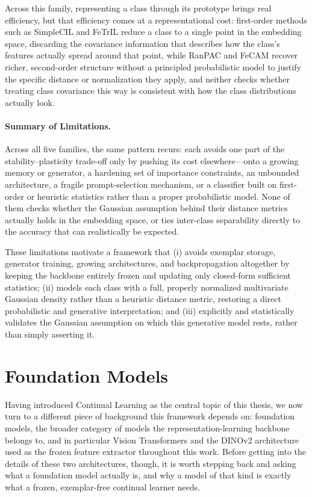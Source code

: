 Across this family, representing a class through its prototype brings real efficiency, but that efficiency comes at a representational cost: first-order methods such as SimpleCIL and FeTrIL reduce a class to a single point in the embedding space, discarding the covariance information that describes how the class's features actually spread around that point, while RanPAC and FeCAM recover richer, second-order structure without a principled probabilistic model to justify the specific distance or normalization they apply, and neither checks whether treating class covariance this way is consistent with how the class distributions actually look.

\paragraph{Summary of Limitations.}
Across all five families, the same pattern recurs: each avoids one part of the stability--plasticity trade-off only by pushing its cost elsewhere---onto a growing memory or generator, a hardening set of importance constraints, an unbounded architecture, a fragile prompt-selection mechanism, or a classifier built on first-order or heuristic statistics rather than a proper probabilistic model. None of them checks whether the Gaussian assumption behind their distance metrics actually holds in the embedding space, or ties inter-class separability directly to the accuracy that can realistically be expected.

These limitations motivate a framework that (i) avoids exemplar storage, generator training, growing architectures, and backpropagation altogether by keeping the backbone entirely frozen and updating only closed-form sufficient statistics; (ii) models each class with a full, properly normalized multivariate Gaussian density rather than a heuristic distance metric, restoring a direct probabilistic and generative interpretation; and (iii) explicitly and statistically validates the Gaussian assumption on which this generative model rests, rather than simply asserting it.

\section{Foundation Models}
\label{sec:framework:foundation_models}

Having introduced Continual Learning as the central topic of this thesis, we now turn to a different piece of background this framework depends on: foundation models, the broader category of models the representation-learning backbone belongs to, and in particular Vision Transformers and the DINOv2 architecture used as the frozen feature extractor throughout this work. Before getting into the details of these two architectures, though, it is worth stepping back and asking what a foundation model actually is, and why a model of that kind is exactly what a frozen, exemplar-free continual learner needs.


